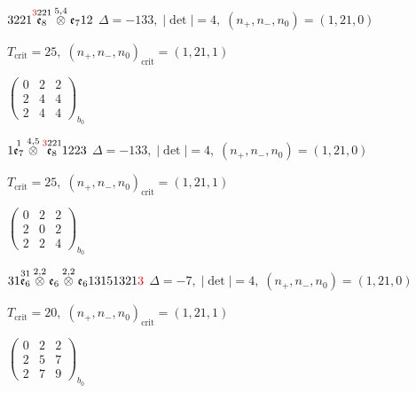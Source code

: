 \documentclass[10pt]{article}
\begin{document}
$3221\overset{\textcolor{red}{3}221}{\mathfrak{e}_8}\overset{5,4}{\otimes}\mathfrak{e}_712$ \quad $\Delta=-133,\; |\det|=4,\; (n_+,n_-,n_0)=(1,21,0)$

\hspace{1em}$T_{\text{crit}}=25,\; (n_+,n_-,n_0)_{\text{crit}}=(1,21,1)$

\hspace{2em}$\left(\begin{smallmatrix}0 & 2 & 2 \\ 2 & 4 & 4 \\ 2 & 4 & 4\end{smallmatrix}\right)_{\!b_0}$

\smallskip

$1\overset{1}{\mathfrak{e}_7}\overset{4,5}{\otimes}\overset{\textcolor{red}{3}221}{\mathfrak{e}_8}1223$ \quad $\Delta=-133,\; |\det|=4,\; (n_+,n_-,n_0)=(1,21,0)$

\hspace{1em}$T_{\text{crit}}=25,\; (n_+,n_-,n_0)_{\text{crit}}=(1,21,1)$

\hspace{2em}$\left(\begin{smallmatrix}0 & 2 & 2 \\ 2 & 0 & 2 \\ 2 & 2 & 4\end{smallmatrix}\right)_{\!b_0}$

\smallskip

$31\overset{31}{\mathfrak{e}_6}\overset{2,2}{\otimes}\mathfrak{e}_6\overset{2,2}{\otimes}\mathfrak{e}_613151321\textcolor{red}{3}$ \quad $\Delta=-7,\; |\det|=4,\; (n_+,n_-,n_0)=(1,21,0)$

\hspace{1em}$T_{\text{crit}}=20,\; (n_+,n_-,n_0)_{\text{crit}}=(1,21,1)$

\hspace{2em}$\left(\begin{smallmatrix}0 & 2 & 2 \\ 2 & 5 & 7 \\ 2 & 7 & 9\end{smallmatrix}\right)_{\!b_0}$

\smallskip
\end{document}
